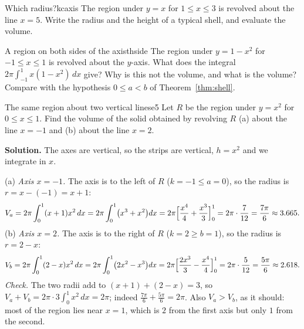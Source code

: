 \documentclass[11pt]{article}
\begin{document}
\begin{kc}{Which radius?}{kcaxis}
The region under $y=x$ for $1\le x\le3$ is revolved about the line $x=5$. Write the radius and the height of a typical shell, and evaluate the volume.
\end{kc}

\begin{think}{A region on both sides of the axis}{thside}
The region under $y=1-x^2$ for $-1\le x\le1$ is revolved about the $y$-axis. What does the integral $2\pi\int_{-1}^1x(1-x^2)\,dx$ give? Why is this not the volume, and what is the volume? Compare with the hypothesis $0\le a<b$ of Theorem~\ref{thm:shell}.
\end{think}

\begin{exmp}{The same region about two vertical lines}{e5}
Let $R$ be the region under $y=x^2$ for $0\le x\le1$. Find the volume of the solid obtained by revolving $R$ (a) about the line $x=-1$ and (b) about the line $x=2$.

\textbf{Solution.} The axes are vertical, so the strips are vertical, $h=x^2$ and we integrate in $x$.

(a) \emph{Axis $x=-1$.} The axis is to the left of $R$ ($k=-1\le a=0$), so the radius is $r=x-(-1)=x+1$:
\[
V_a=2\pi\int_0^1(x+1)x^2\,dx=2\pi\int_0^1\bigl(x^3+x^2\bigr)dx=2\pi\Bigl[\frac{x^4}4+\frac{x^3}3\Bigr]_0^1=2\pi\cdot\frac7{12}=\frac{7\pi}6\approx3.665 .
\]
(b) \emph{Axis $x=2$.} The axis is to the right of $R$ ($k=2\ge b=1$), so the radius is $r=2-x$:
\[
V_b=2\pi\int_0^1(2-x)x^2\,dx=2\pi\int_0^1\bigl(2x^2-x^3\bigr)dx=2\pi\Bigl[\frac{2x^3}3-\frac{x^4}4\Bigr]_0^1=2\pi\cdot\frac5{12}=\frac{5\pi}6\approx2.618 .
\]
\emph{Check.} The two radii add to $(x+1)+(2-x)=3$, so $V_a+V_b=2\pi\cdot3\int_0^1x^2\,dx=2\pi$; indeed $\frac{7\pi}6+\frac{5\pi}6=2\pi$. Also $V_a>V_b$, as it should: most of the region lies near $x=1$, which is $2$ from the first axis but only $1$ from the second.


\end{exmp}
\end{document}
